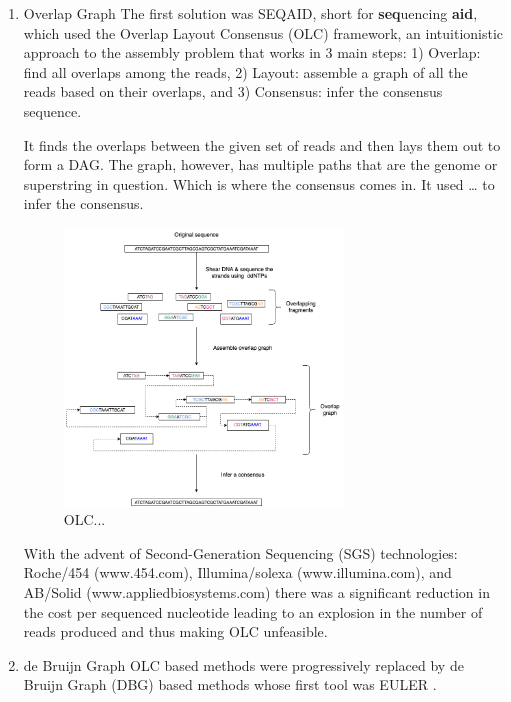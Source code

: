 \documentclass[11pt]{article}
\begin{document}
\begin{enumerate}
\item Overlap Graph
\label{sec:orgf1cf600}
The first solution was SEQAID, short for \textbf{seq}uencing \textbf{aid},
\cite{peltolaSEQAIDDNASequence1984} which used the  Overlap Layout Consensus (OLC)
framework, an intuitionistic approach to the assembly problem that works in  
3 main steps: 1) Overlap: find all overlaps among the reads, 2) Layout: assemble
a graph of all the reads based on their overlaps, and 3) Consensus: infer the
consensus sequence.

It finds the overlaps between the given set of reads and then lays 
them out to form a DAG. The graph, however, has multiple paths that are the 
genome or superstring in question. Which is where the consensus comes in. 
It used … to infer the consensus.

\begin{figure}[H]
\centering
\includegraphics[width=0.7\textwidth]{./figures/OLC framework.png}
\caption{OLC...}
\end{figure}

With the advent of Second-Generation Sequencing (SGS) technologies: 
Roche/454 (www.454.com), Illumina/solexa (www.illumina.com),
and AB/Solid (www.appliedbiosystems.com) there was a significant reduction in 
the cost per sequenced nucleotide \cite{liComparisonTwoMajor2012} leading to an 
explosion in the number of reads produced and thus making OLC unfeasible. 

\item de Bruijn Graph
\label{sec:org9f3ff6b}
OLC based methods were progressively replaced by de Bruijn Graph (DBG)
\cite{iduryNewAlgorithmDNA1995} based methods whose first tool was EULER
\cite{pevznerEulerianPathApproach2001}.


\end{enumerate}
\end{document}
